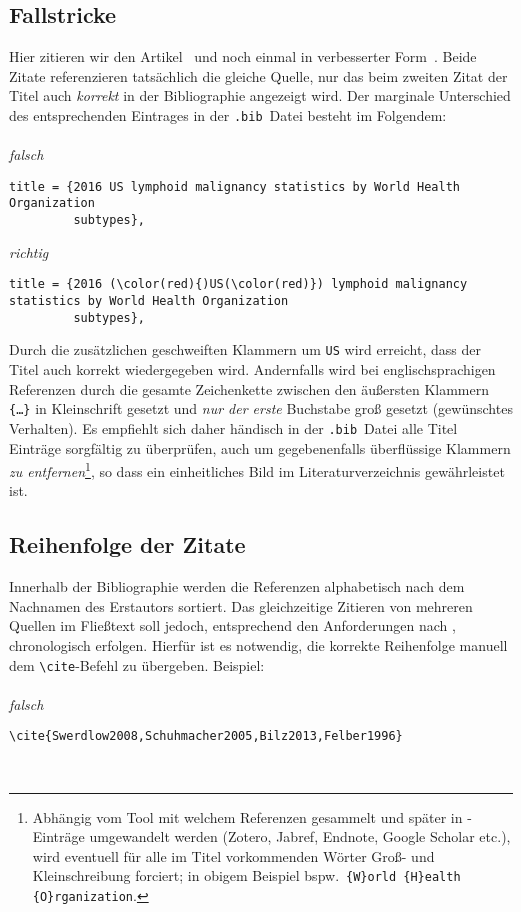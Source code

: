 \documentclass[a4paper,10pt]{scrartcl}
\renewcommand{\cite}{\citep}  %
\begin{document}
\subsection{Fallstricke}
Hier zitieren wir den Artikel~\cite{Teras2016_FALSCH} und noch einmal in
verbesserter Form~\cite{Teras2016_RICHTIG}. Beide Zitate referenzieren
tats\"achlich die gleiche Quelle, nur das beim zweiten Zitat der
Titel auch \emph{korrekt} in der Bibliographie angezeigt wird. Der
marginale Unterschied des entsprechenden Eintrages
in der \verb|.bib|~Datei besteht im Folgendem:\\\\
\emph{falsch}
\begin{Verbatim}
title = {2016 US lymphoid malignancy statistics by World Health Organization
         subtypes},
\end{Verbatim}
\emph{richtig}
\begin{Verbatim}[commandchars=\\\(\)]
title = {2016 (\color(red){)US(\color(red)}) lymphoid malignancy statistics by World Health Organization
         subtypes},
\end{Verbatim}
Durch die zusätzlichen geschweiften Klammern um \texttt{US} wird erreicht, dass 
der Titel auch korrekt wiedergegeben wird. Andernfalls wird bei englischsprachigen
Referenzen durch  die gesamte Zeichenkette zwischen den
\"au{\ss}ersten Klammern \texttt{\{\ldots \}} in Kleinschrift gesetzt und
\emph{nur der erste} Buchstabe gro{\ss} gesetzt (gewünschtes Verhalten). Es 
empfiehlt sich daher händisch in der
\verb|.bib|~Datei alle Titel Einträge sorgfältig zu überprüfen, auch um
gegebenenfalls überflüssige Klammern \emph{zu entfernen}\footnote{Abhängig vom
Tool mit welchem Referenzen gesammelt und später in -Einträge
umgewandelt werden (Zotero, Jabref, Endnote, Google Scholar etc.), wird
eventuell für alle im Titel vorkommenden Wörter
Gro{\ss}- und Kleinschreibung forciert; in obigem Beispiel bspw.\ 
\verb|{W}orld {H}ealth {O}rganization|.}, so dass ein einheitliches Bild im 
Literaturverzeichnis gewährleistet ist.

\subsection{Reihenfolge der Zitate}
Innerhalb der Bibliographie werden die Referenzen alphabetisch nach dem Nachnamen 
des Erstautors sortiert. Das gleichzeitige Zitieren von mehreren Quellen im 
Fließtext soll jedoch, entsprechend den
Anforderungen nach \cite{Bilz2013}, chronologisch erfolgen. 
Hierfür ist es notwendig, die korrekte Reihenfolge manuell dem 
\verb|\cite|-Befehl zu übergeben. Beispiel:\\\\
\emph{falsch}
\begin{Verbatim}
\cite{Swerdlow2008,Schuhmacher2005,Bilz2013,Felber1996}
\end{Verbatim}
\vspace{-0.8em}
\cite{Swerdlow2008,Schuhmacher2005,Bilz2013,Felber1996}\\
\end{document}
